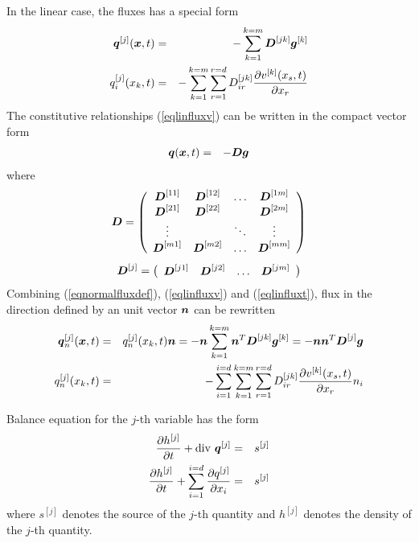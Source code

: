 In the linear case, the fluxes has a special form
\begin{eqnarray}\label{eqlinfluxv}
\mbox{\boldmath$q$}^{[j]}(\mbox{\boldmath$x$},t) &=& - \sum_{k=1}^{k=m} \mbox{\boldmath$D$}^{[jk]} \mbox{\boldmath$g$}^{[k]}
\\ \label{eqlinfluxt}
q^{[j]}_i(x_k,t) &=& - \sum_{k=1}^{k=m} \sum_{r=1}^{r=d} D^{[jk]}_{ir} \mbox{$\displaystyle\frac{\partial{v^{[k]}(x_s,t)}}{\partial{x_r}}$}
\end{eqnarray}
The constitutive relationships (\ref{eqlinfluxv}) can be written in the compact vector form
\begin{eqnarray}
\mbox{\boldmath$q$}(\mbox{\boldmath$x$},t) &=& - \mbox{\boldmath$D$} \mbox{\boldmath$g$}
\end{eqnarray}
where
\begin{eqnarray}
\mbox{\boldmath$D$} = \left(\begin{array}{cccc}
\mbox{\boldmath$D$}^{[11]} & \mbox{\boldmath$D$}^{[12]} & \ldots & \mbox{\boldmath$D$}^{[1m]}
\\
\mbox{\boldmath$D$}^{[21]} & \mbox{\boldmath$D$}^{[22]} &        & \mbox{\boldmath$D$}^{[2m]}
\\
\vdots      &             & \ddots & \vdots
\\
\mbox{\boldmath$D$}^{[m1]} & \mbox{\boldmath$D$}^{[m2]} & \ldots & \mbox{\boldmath$D$}^{[mm]}
\end{array}\right)
\end{eqnarray}
\begin{eqnarray}
\mbox{\boldmath$D$}^{[j]} = \left(\begin{array}{cccc}
\mbox{\boldmath$D$}^{[j1]} & \mbox{\boldmath$D$}^{[j2]} & \ldots & \mbox{\boldmath$D$}^{[jm]}
\end{array}\right)
\end{eqnarray}
Combining (\ref{eqnormalfluxdef}), (\ref{eqlinfluxv}) and (\ref{eqlinfluxt}),
flux in the direction defined by an unit vector $\mbox{\boldmath$n$}$ can be rewritten
\begin{eqnarray}\label{eqnormalfluxv}
\mbox{\boldmath$q$}^{[j]}_n(\mbox{\boldmath$x$},t) &=& q^{[j]}_n(x_k,t) \mbox{\boldmath$n$} = - \mbox{\boldmath$n$} \sum_{k=1}^{k=m} \mbox{\boldmath$n$}^T \mbox{\boldmath$D$}^{[jk]} \mbox{\boldmath$g$}^{[k]} =
- \mbox{\boldmath$n$} \mbox{\boldmath$n$}^T \mbox{\boldmath$D$}^{[j]} \mbox{\boldmath$g$}
\\ \label{eqnormalfluxt}
q^{[j]}_n(x_k,t) &=& - \sum_{i=1}^{i=d} \sum_{k=1}^{k=m} \sum_{r=1}^{r=d} D^{[jk]}_{ir} \mbox{$\displaystyle\frac{\partial{v^{[k]}(x_s,t)}}{\partial{x_r}}$} n_i
\end{eqnarray}



Balance equation for the $j$-th variable has the form
\begin{eqnarray}
\mbox{$\displaystyle\frac{\partial{h^{[j]}}}{\partial{t}}$} + {\rm div}\ \mbox{\boldmath$q$}^{[j]} &=& s^{[j]}
\\
\mbox{$\displaystyle\frac{\partial{h^{[j]}}}{\partial{t}}$} + \sum_{i=1}^{i=d}\mbox{$\displaystyle\frac{\partial{q^{[j]}}}{\partial{x_i}}$} &=& s^{[j]}
\end{eqnarray}
where $s^{[j]}$ denotes the source of the $j$-th quantity and $h^{[j]}$
denotes the density of the $j$-th quantity.

